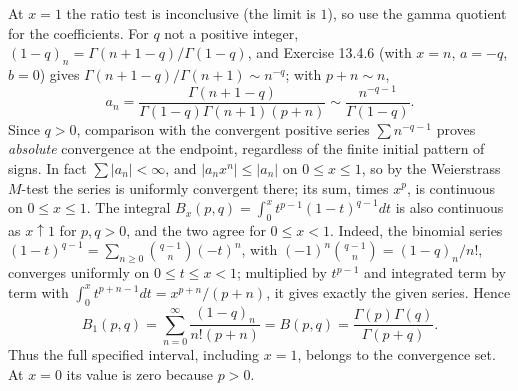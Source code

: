 At $x=1$ the ratio test is inconclusive (the limit is $1$), so
use the gamma quotient for the coefficients.  For $q$ not a
positive integer, $(1-q)_n=\Gamma(n+1-q)/\Gamma(1-q)$, and
Exercise 13.4.6 (with $x=n$, $a=-q$, $b=0$) gives
$\Gamma(n+1-q)/\Gamma(n+1)\sim n^{-q}$; with $p+n\sim n$,
\[
a_n=\frac{\Gamma(n+1-q)}{\Gamma(1-q)\Gamma(n+1)(p+n)}
\sim\frac{n^{-q-1}}{\Gamma(1-q)}.
\]
Since $q>0$, comparison with the convergent positive series
$\sum n^{-q-1}$ proves \emph{absolute} convergence at the
endpoint, regardless of the finite initial pattern of signs.
In fact $\sum|a_n|<\infty$, and $|a_nx^n|\le|a_n|$ on
$0\le x\le1$, so by the Weierstrass $M$-test the series is
uniformly convergent there; its sum, times $x^p$, is continuous
on $0\le x\le1$.  The integral
$B_x(p,q)=\int_0^xt^{p-1}(1-t)^{q-1}dt$ is also continuous as
$x\uparrow1$ for $p,q>0$, and the two agree for $0\le x<1$.
Indeed, the binomial series
$(1-t)^{q-1}=\sum_{n\ge0}\binom{q-1}{n}(-t)^n$, with
$(-1)^n\binom{q-1}{n}=(1-q)_n/n!$, converges uniformly on
$0\le t\le x<1$; multiplied by $t^{p-1}$ and integrated term by
term with $\int_0^xt^{p+n-1}dt=x^{p+n}/(p+n)$, it gives exactly
the given series.  Hence
\[
\boxed{B_1(p,q)=\sum_{n=0}^{\infty}\frac{(1-q)_n}{n!(p+n)}
=B(p,q)=\frac{\Gamma(p)\Gamma(q)}{\Gamma(p+q)}}.
\]
Thus the full specified interval, including $x=1$, belongs
to the convergence set.  At $x=0$ its value is zero because $p>0$.


